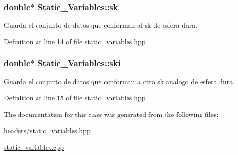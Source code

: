 \subsubsection[{\texorpdfstring{sk}{sk}}]{\setlength{\rightskip}{0pt plus 5cm}double$\ast$ Static\+\_\+\+Variables\+::sk\hspace{0.3cm}{\ttfamily [protected]}}\hypertarget{class_static___variables_ac98dbad42639695292f1a54bd1cd21aa}{}\label{class_static___variables_ac98dbad42639695292f1a54bd1cd21aa}
Guarda el conjunto de datos que conforman al sk de esfera dura. 

Definition at line 14 of file static\+\_\+variables.\+hpp.

\subsubsection[{\texorpdfstring{ski}{ski}}]{\setlength{\rightskip}{0pt plus 5cm}double$\ast$ Static\+\_\+\+Variables\+::ski\hspace{0.3cm}{\ttfamily [protected]}}\hypertarget{class_static___variables_a50cb44587bddb99ed38512e636c4ea20}{}\label{class_static___variables_a50cb44587bddb99ed38512e636c4ea20}
Guarda el conjunto de datos que conforman a otro sk analogo de esfera dura. 

Definition at line 15 of file static\+\_\+variables.\+hpp.



The documentation for this class was generated from the following files\+:\begin{DoxyCompactItemize}
\item 
headers/\hyperlink{static__variables_8hpp}{static\+\_\+variables.\+hpp}\item 
\hyperlink{static__variables_8cpp}{static\+\_\+variables.\+cpp}\end{DoxyCompactItemize}
